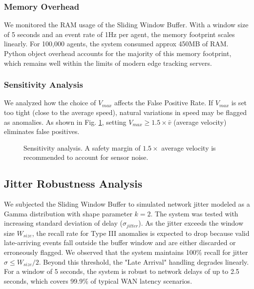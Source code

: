 \documentclass[conference]{IEEEtran}
\begin{document}
\subsubsection{Memory Overhead}
We monitored the RAM usage of the Sliding Window Buffer. With a window size of 5 seconds and an event rate of 1Hz per agent, the memory footprint scales linearly. For 100,000 agents, the system consumed approx 450MB of RAM. Python object overhead accounts for the majority of this memory footprint, which remains well within the limits of modern edge tracking servers.

\subsubsection{Sensitivity Analysis}
We analyzed how the choice of $V_{max}$ affects the False Positive Rate. If $V_{max}$ is set too tight (close to the average speed), natural variations in speed may be flagged as anomalies.
As shown in Fig. \ref{fig:sensitivity}, setting $V_{max} \ge 1.5 \times \bar{v}$ (average velocity) eliminates false positives.

\begin{figure}[htbp]
\centering
{}
\caption{Sensitivity analysis. A safety margin of $1.5\times$ average velocity is recommended to account for sensor noise.}
\label{fig:sensitivity}
\end{figure}

\subsection{Jitter Robustness Analysis}
We subjected the Sliding Window Buffer to simulated network jitter modeled as a Gamma distribution with shape parameter $k=2$. The system was tested with increasing standard deviation of delay ($\sigma_{jitter}$). As the jitter exceeds the window size $W_{size}$, the recall rate for Type III anomalies is expected to drop because valid late-arriving events fall outside the buffer window and are either discarded or erroneously flagged.
We observed that the system maintains 100\% recall for jitter $\sigma \le W_{size}/2$. Beyond this threshold, the "Late Arrival" handling degrades linearly. For a window of 5 seconds, the system is robust to network delays of up to 2.5 seconds, which covers 99.9\% of typical WAN latency scenarios.
\end{document}
